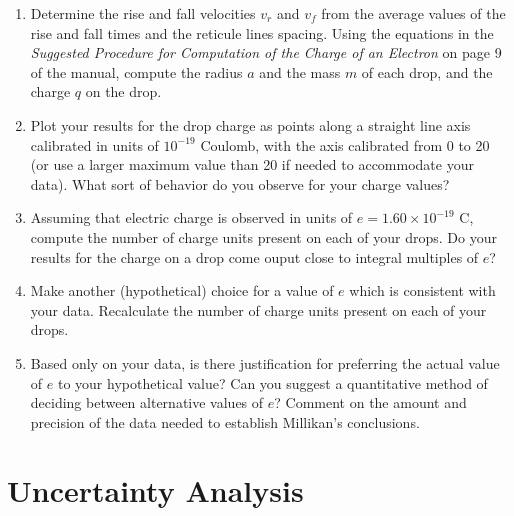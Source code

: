 \begin{enumerate}
\item Determine the rise and fall velocities
$v_r$ and $v_f$ from the average values of the
rise and fall times and the reticule lines spacing. Using the equations
in the {\em Suggested Procedure for Computation of
the Charge of an Electron} on page 9 of the manual,
compute the radius $a$ and the mass $m$ of each drop, and the charge $q$ on
the drop. 


\item Plot your results for the drop charge as points along a
straight line axis calibrated in units of
$10^{-19}$ Coulomb, with the axis
calibrated from 0 to 20 (or use a larger maximum value than 20 if
needed to accommodate your data).  What sort of behavior do you
observe for your charge values?

\item Assuming that electric charge is observed in units of $e =
1.60 \times 10^{-19}$ C, compute the
number of charge units present on each of your drops.  Do your results
for the charge on a drop come ouput close to integral multiples of $e$?

\item Make another (hypothetical) choice for a value of $e$ which is
consistent with your data.  Recalculate the number of charge units
present on each of your drops.

\item Based only on your data, is there justification for preferring the
actual value of $e$ to your hypothetical value?  Can you suggest a quantitative method of deciding
between alternative values of $e$?  Comment on the amount and precision
of the data needed to establish Millikan's
conclusions.
\end{enumerate}

\section{Uncertainty Analysis}

